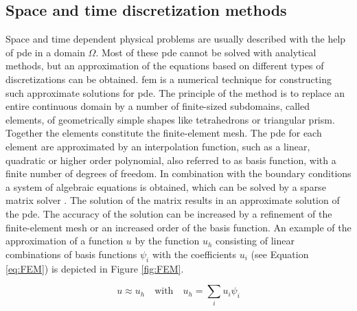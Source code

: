 \subsection{Space and time discretization methods}
\label{subsec:FEM}
Space and time dependent physical problems are usually described with the help of \gls{pde} in a domain $\Omega$. Most of these \gls{pde} cannot be solved with analytical methods, but an approximation of the equations based on different types of discretizations can be obtained. \Gls{fem} is a numerical technique for constructing such approximate solutions for \gls{pde}. The principle of the method is to replace an entire continuous domain by a number of finite-sized subdomains, called elements, of geometrically simple shapes like tetrahedrons or triangular prism. Together the elements constitute the finite-element mesh. The \gls{pde} for each element are approximated by an interpolation function, such as a linear, quadratic or higher order polynomial, also referred to as basis function, with a finite number of degrees of freedom. In combination with the boundary conditions a  system of algebraic equations is obtained, which can be solved by a sparse matrix solver \cite{john2016finite}. The solution of the matrix results in an approximate solution of the \gls{pde}. The accuracy of the solution can be increased by a refinement of the finite-element mesh or an increased order of the basis function. An example of the approximation of a function $u$ by the function $u_{h}$ consisting of linear combinations of basis functions $\psi_{i}$ with the coefficients $u_{i}$ (see Equation \ref{eq:FEM}) is depicted in Figure \ref{fig:FEM}. 

\begin{equation}
u\approx u_{h} \quad \textrm{with} \quad u_{h}=\sum_{i}u_{i}\psi_{i}
\label{eq:FEM}
\end{equation}

